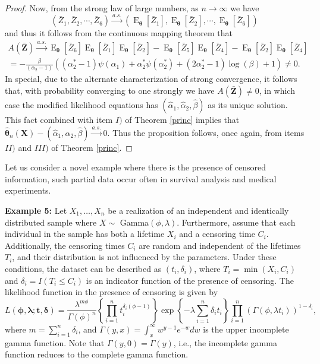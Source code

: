 \documentclass[10pt,a4paper,onecolumn]{article} %
\newcommand{\bs}{\boldsymbol}
\newcommand{\on}{\operatorname}
\begin{document}
\begin{proof}
 Now, from the strong law of large numbers, as $n\to \infty$ we have
\begin{equation*}
\left(\bar{Z}_1,\bar{Z}_2,\cdots,\bar{Z}_6\right)\overset{a.s.}{\to}\left(\on{E}_{\bs{\theta}}\left[\bar{Z}_1\right],\on{E}_{\bs{\theta}}\left[\bar{Z}_2\right],\cdots,\on{E}_{\bs{\theta}}\left[\bar{Z}_6\right]\right)
\end{equation*}
and thus it follows from the continuous mapping theorem that
\begin{equation*}
\begin{aligned}
A(\bs{\bar{Z}})\overset{a.s.}{\to} \on{E}_{\bs{\theta}}\left[\bar{Z}_6\right]\on{E}_{\bs{\theta}}\left[\bar{Z}_1\right]\on{E}_{\bs{\theta}}\left[\bar{Z}_2\right] - \on{E}_{\bs{\theta}}\left[\bar{Z}_5\right]\on{E}_{\bs{\theta}}\left[\bar{Z}_4\right] - \on{E}_{\bs{\theta}}\left[\bar{Z}_2\right]\on{E}_{\bs{\theta}}\left[\bar{Z}_4\right]\\
= -\frac{\beta}{(\alpha_2-1)}\left((\alpha_2^*-1)\psi(\alpha_1) + \alpha_2^*\psi(\alpha_2^*) + (2\alpha_2^*-1)\log(\beta) + 1\right)\neq 0.
\end{aligned}
\end{equation*}
In special, due to the alternate characterization of strong convergence, it follows that, with probability converging to one strongly we have $A(\bs{\bar{Z}})\neq 0$, in which case the modified likelihood equations has $(\hat\alpha_1,\hat\alpha_2,\hat\beta)$ as its unique solution. This fact combined with item $I)$ of Theorem \ref{princ} implies that $\bs{\hat{\theta}}_n(\bs{X})-(\hat\alpha_1,\hat\alpha_2,\hat\beta)\overset{a.s.}{\to} 0$. Thus the proposition follows, once again, from items $II)$ and $III)$ of Theorem \ref{princ}.
\end{proof}

Let us consider a novel example where there is the presence of censored information, such partial data occur often in survival analysis and medical experiments.

\noindent\textbf{Example 5:} Let $X_1,\ldots,X_n$ be a realization of an independent and identically distributed sample where $X\sim$ Gamma$(\phi,\lambda)$. Furthermore, assume that each individual in the sample has both a lifetime $X_i$ and a censoring time $C_i$. Additionally, the censoring times $C_i$ are random and independent of the lifetimes $T_i$, and their distribution is not influenced by the parameters. Under these conditions, the dataset can be described as $(t_i,\delta_i)$, where $T_i=\min(X_i,C_i)$ and $\delta_i=I(T_i\leq C_i)$ is an indicator function of the presence of censoring. The likelihood function in the presence of censoring is given by
\begin{equation*}L(\boldsymbol{\phi,\lambda; t,\delta})
=\frac{\lambda^{m\phi}}{\Gamma(\phi)^n}\left\{\prod_{i=1}^n{t_i^{\delta_i(\phi-1)}}\right\}\exp\left\{-\lambda\sum_{i=1}^n {\delta_i}t_i\right\}\prod_{i=1}^n\left(\Gamma(\phi,\lambda t_i)\right)^{1-\delta_i},
\end{equation*}
where $m=\sum_{i=1}^{n}\delta_i$, and $\Gamma(y,x) =\int_{x}^{\infty}{w^{y-1}e^{-w}dw}$ is the upper incomplete gamma function. Note that $\Gamma(y,0)=\Gamma(y)$, i.e., the incomplete gamma function reduces to the complete gamma function.
\end{document}
